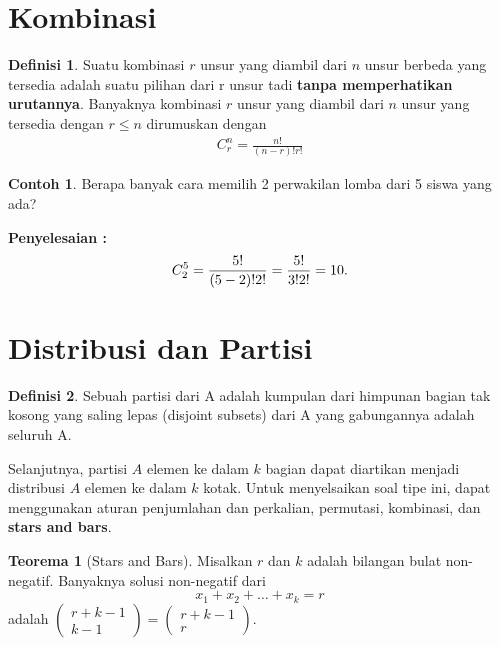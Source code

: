 \documentclass[aspectratio=169]{beamer}
\theoremstyle{definition}
\newtheorem{definisi}{Definisi}
\newtheorem{teorema}{Teorema}
\newtheorem{contoh}{Contoh}
\begin{document}
\section{Kombinasi}
\begin{frame}{\insertsection}
  \begin{definisi}
    Suatu kombinasi $r$ unsur yang diambil dari $n$ unsur berbeda yang tersedia adalah suatu pilihan dari r unsur tadi\textbf{ tanpa memperhatikan urutannya}. Banyaknya kombinasi $r$ unsur yang diambil dari $n$ unsur yang tersedia dengan $r \leq n$ dirumuskan dengan
    \begin{align}
      C_r^n=\frac{n!}{(n-r)!r!}
    \end{align}
  \end{definisi}
\end{frame}

\begin{frame}{\insertsection}
  \begin{contoh}
    Berapa banyak cara memilih 2 perwakilan lomba dari 5 siswa yang ada?

    \textbf{Penyelesaian : }\\
    \begin{align}
      C_2^5=\frac{5!}{(5-2)!2!}=\frac{5!}{3!2!}=10. \notag
    \end{align}
  \end{contoh}
\end{frame}


\section{Distribusi dan Partisi}
\begin{frame}{\insertsection}
  \begin{definisi}
    Sebuah partisi dari A adalah kumpulan dari himpunan bagian tak kosong yang saling lepas (disjoint subsets) dari A yang gabungannya adalah seluruh A.
  \end{definisi}

  Selanjutnya, partisi $A$ elemen ke dalam $k$ bagian dapat diartikan menjadi distribusi $A$ elemen ke dalam $k$ kotak.
  Untuk menyelsaikan soal tipe ini, dapat menggunakan aturan penjumlahan dan perkalian, permutasi, kombinasi, dan \textbf{stars and bars}.
\end{frame}

\begin{frame}{\insertsection}
  \begin{teorema}[Stars and Bars]
    Misalkan $r$ dan $k$ adalah bilangan bulat non-negatif. Banyaknya solusi non-negatif dari
    $$x_1+x_2+\ldots+x_k=r$$
    adalah $\begin{pmatrix}
        r+k-1 \\k-1
      \end{pmatrix}=\begin{pmatrix}
        r+k-1 \\r
      \end{pmatrix}$.
  \end{teorema}
\end{frame}
\end{document}
